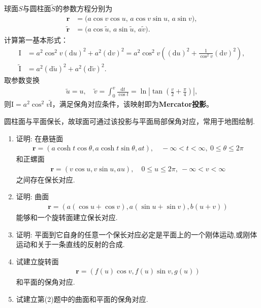 \documentclass[../../main.tex]{subfiles}%
\begin{document}
\begin{solution}

球面$S$与圆柱面$\tilde S$的参数方程分别为
\begin{align*}
\bm r&=\big(a\cos v\cos u,\,a\cos v\sin u,\,a\sin v\big),\\
\tilde{\bm r}&=\big(a\cos\tilde u,\,a\sin\tilde u,\,a\tilde v\big).
\end{align*}
计算第一基本形式：
\begin{align*}
\mathrm{I}&=a^2\cos^2v(\mathrm{d}u)^2+a^2(\mathrm{d}v)^2=a^2\cos^2v\left((\mathrm{d}u)^2+\frac{1}{\cos^2v}(\mathrm{d}v)^2\right),\\
\tilde{\mathrm{I}}&=a^2(\mathrm{d}\tilde u)^2+a^2(\mathrm{d}\tilde v)^2.
\end{align*}
取参数变换
\begin{align*}
\tilde u=u,\quad \tilde v=\int_{0}^{v}\frac{\mathrm{d}t}{\cos t}=\ln\left|\tan\left(\frac{v}{2}+\frac{\pi}{4}\right)\right|,
\end{align*}
则$\mathrm{I}=a^2\cos^2v\tilde{\mathrm{I}}$，满足保角对应条件，该映射即为\textbf{Mercator投影}。

圆柱面与平面保长，故球面可通过该投影与平面局部保角对应，常用于地图绘制.

\end{solution}

\begin{example}
\begin{enumerate}[(1)]
\item 证明: 在悬链面
\begin{align*}
\boldsymbol{r}=(a\cosh t\cos\theta,a\cosh t\sin\theta,at),\quad -\infty<t<\infty,\ 0\leqslant\theta\leqslant2\pi
\end{align*}
和正螺面
\begin{align*}
\boldsymbol{r}=(v\cos u,v\sin u,au),\quad 0\leqslant u\leqslant2\pi,\ -\infty<v<\infty
\end{align*}
之间存在保长对应.

\item 证明: 曲面
\begin{align*}
\boldsymbol{r}=(a(\cos u+\cos v),a(\sin u+\sin v),b(u+v))
\end{align*}
能够和一个旋转面建立保长对应.

\item 证明: 平面到它自身的任意一个保长对应必定是平面上的一个刚体运动,或刚体运动和关于一条直线的反射的合成.

\item 试建立旋转面
\begin{align*}
\boldsymbol{r}=(f(u)\cos v,f(u)\sin v,g(u))
\end{align*}
和平面的保角对应.

\item 试建立第(2)题中的曲面和平面的保角对应.
\end{enumerate}
\end{example}
\end{document}
